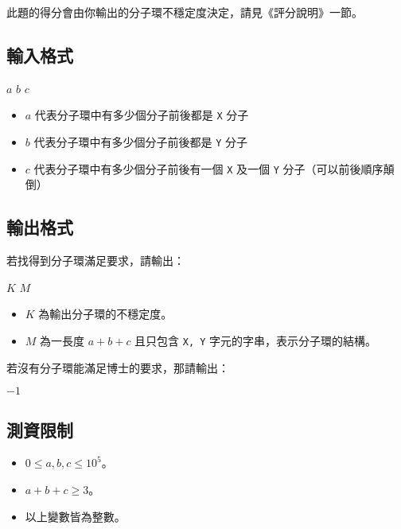 此題的得分會由你輸出的分子環不穩定度決定，請見《評分說明》一節。

\subsection{輸入格式}

\begin{format}
\f{
$a$ $b$ $c$
}
\end{format}

\begin{itemize}
\tightlist
\item
  \(a\) 代表分子環中有多少個分子前後都是 \texttt{X} 分子
\item
  \(b\) 代表分子環中有多少個分子前後都是 \texttt{Y} 分子
\item
  \(c\) 代表分子環中有多少個分子前後有一個 \texttt{X} 及一個 \texttt{Y}
  分子（可以前後順序顛倒）
\end{itemize}

\subsection{輸出格式}

若找得到分子環滿足要求，請輸出：

\begin{format}
\f{
$K$
$M$
}
\end{format}

\begin{itemize}
\tightlist
\item
  \(K\) 為輸出分子環的不穩定度。
\item
  \(M\) 為一長度 \(a+b+c\) 且只包含 \texttt{X,\ Y}
  字元的字串，表示分子環的結構。
\end{itemize}

若沒有分子環能滿足博士的要求，那請輸出：

\begin{format}
\f{
$-1$
}
\end{format}

\subsection{測資限制}

\begin{itemize}
\tightlist
\item
  \(0 \le a, b, c \le 10^5\)。
\item
  \(a+b+c \ge 3\)。
\item
  以上變數皆為整數。
\end{itemize}

